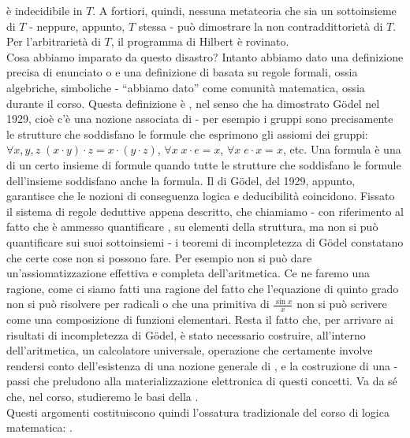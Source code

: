 è indecidibile in $T$. A fortiori, quindi, nessuna metateoria che sia un sottoinsieme di $T$ - neppure, appunto, $T$ stessa - può dimostrare la non contraddittorietà di $T$.
Per l'arbitrarietà di $T$, il programma di Hilbert è rovinato.\\
Cosa abbiamo imparato da questo disastro? Intanto abbiamo dato una definizione precisa di enunciato o  e una definizione di  basata su regole formali, ossia algebriche, simboliche - ``abbiamo dato'' come comunità matematica, ossia  durante il corso.
Questa definizione è , nel senso che ha dimostrato Gödel nel 1929, cioè c'è una nozione associata di  - per esempio i gruppi sono precisamente le strutture che soddisfano le formule che esprimono gli assiomi dei gruppi: $\forall x,y,z \; (x \cdot y) \cdot z = x \cdot (y \cdot z)$, $\forall x \; x \cdot e = x$,
$\forall x \; e \cdot x = x$, etc. Una formula è una  di un certo insieme di formule quando tutte le strutture che soddisfano le formule dell'insieme soddisfano anche la formula. Il  di Gödel, del 1929, appunto, garantisce che le nozioni di conseguenza logica e deducibilità coincidono.
Fissato il sistema di regole deduttive appena descritto, che chiamiamo  - con riferimento al fatto che è ammesso quantificare ,  su elementi della struttura, ma non si può quantificare sui suoi sottoinsiemi - i teoremi di incompletezza di Gödel constatano 
che certe cose non si possono fare. Per esempio non si può dare un'assiomatizzazione effettiva e completa dell'aritmetica. Ce ne faremo una ragione, come ci siamo fatti una ragione del fatto che l'equazione di quinto grado non si può risolvere per radicali o che una primitiva di $\frac{\sin x}{x}$ non si può scrivere come una composizione di funzioni elementari.
Resta il fatto che, per arrivare ai risultati di incompletezza di Gödel, è stato necessario costruire, all'interno dell'aritmetica, un calcolatore universale, operazione che certamente involve rendersi conto dell'esistenza di una nozione generale di , e la costruzione di una  - passi che preludono 
alla materializzazione elettronica di questi concetti. Va da sé che, nel corso, studieremo le basi della .\\
Questi argomenti costituiscono quindi l'ossatura tradizionale del corso di logica matematica: .\\
